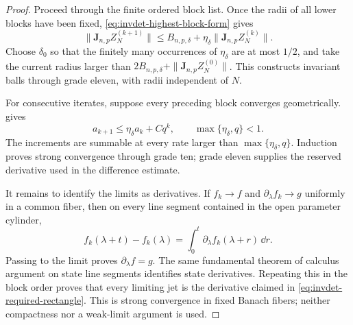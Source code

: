 \begin{proof}
Proceed through the finite ordered block list.  Once the radii of all lower
blocks have been fixed, \cref{eq:invdet-highest-block-form} gives
\begin{equation}
 \|\mathbf J_{n,p}Z_N^{(k+1)}\|
 \leq B_{n,p,\delta}
      +\eta_\delta\|\mathbf J_{n,p}Z_N^{(k)}\|.       \label{eq:invdet-invariant-jet-recurrence}
\end{equation}
Choose \(\delta_0\) so that the finitely many occurrences of
\(\eta_\delta\) are at most \(1/2\), and take the current radius larger than
\(2B_{n,p,\delta}+\|\mathbf J_{n,p}Z_N^{(0)}\|\).  This constructs invariant
balls through grade eleven, with radii independent of \(N\).

For consecutive iterates, suppose every preceding block converges
geometrically.   gives
\begin{equation}
 a_{k+1}\leq\eta_\delta a_k+Cq^k,
 \qquad \max\{\eta_\delta,q\}<1.                    \label{eq:invdet-jet-increment-recurrence}
\end{equation}
The increments are summable at every rate larger than
\(\max\{\eta_\delta,q\}\).  Induction proves strong convergence through
grade ten; grade eleven supplies the reserved derivative used in the
difference estimate.

It remains to identify the limits as derivatives.  If
\(f_k\to f\) and \(\partial_\lambda f_k\to g\) uniformly in a common fiber,
then on every line segment contained in the open parameter cylinder,
\begin{equation}
 f_k(\lambda+t)-f_k(\lambda)
 =\int_0^t\partial_\lambda f_k(\lambda+r)\,\dd r.     \label{eq:invdet-line-segment}
\end{equation}
Passing to the limit proves \(\partial_\lambda f=g\).  The same fundamental
theorem of calculus argument on state line segments identifies state
derivatives.  Repeating this in the block order proves that every limiting
jet is the derivative claimed in \cref{eq:invdet-required-rectangle}.
This is strong convergence in fixed Banach fibers; neither compactness nor
a weak-limit argument is used.
\end{proof}

